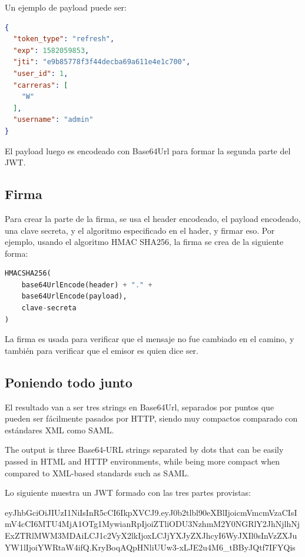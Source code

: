 Un ejemplo de payload puede ser: 

\begin{lstlisting}[language=json,firstnumber=1]
{
  "token_type": "refresh",
  "exp": 1582059853,
  "jti": "e9b85778f3f44decba69a611e4e1c700",
  "user_id": 1,
  "carreras": [
    "W"
  ],
  "username": "admin"
}
\end{lstlisting}

El payload luego es encodeado con Base64Url para formar la segunda parte del JWT.

\subsection[Firma]{Firma}

Para crear la parte de la firma, se usa el header encodeado, el payload encodeado, una clave secreta, y el algoritmo especificado en el hader, y firmar eso.
Por ejemplo, usando el algoritmo HMAC SHA256, la firma se crea de la siguiente forma: 

\begin{lstlisting}[language=Python]
HMACSHA256(
    base64UrlEncode(header) + "." +
    base64UrlEncode(payload),
    clave-secreta
)
\end{lstlisting}
La firma es usada para verificar que el mensaje no fue cambiado en el camino, y también para verificar que el emisor es quien dice ser.

\subsection[Poniendo todo junto]{Poniendo todo junto}

El resultado van a ser tres strings en Base64Url, separados por puntos que pueden ser fácilmente pasados por HTTP, siendo muy compactos comparado con estándares XML como SAML.

The output is three Base64-URL strings separated by dots that can be easily passed in HTML and HTTP environments, while being more compact when compared to XML-based standards such as SAML.

Lo siguiente muestra un JWT formado con las tres partes provistas:


eyJhbGciOiJIUzI1NiIsInR5cCI6IkpXVCJ9.\break eyJ0b2tlbl90eXBlIjoicmVmcmVzaCIsImV4cCI6MTU4MjA1OTg1MywianRpIj\break oiZTliODU3NzhmM2Y0NGRlY2JhNjlhNjExZTRlMWM3MDAiLCJ1c2VyX2lkIj\break oxLCJjYXJyZXJhcyI6WyJXIl0sInVzZXJuYW1lIjoiYWRtaW4ifQ.\break KryBoqAQpHNliUUw3-xLJE2u4M6_tBByJQtf7IFYQis



